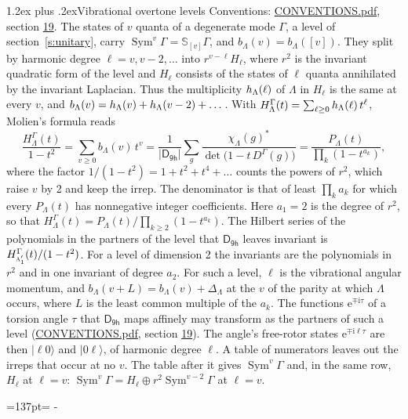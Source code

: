\documentclass[10pt,a4paper]{article}
\makeatletter
\renewcommand\section{\@startsection{section}{1}{\z@}{-3ex plus -1ex minus -.2ex}%
  {1.2ex plus .2ex}{\normalfont\large\sffamily\bfseries\color{parttitle}}}
\newcommand{\needspace}[1]{\par\penalty-100\begingroup\dimen0=#1\relax\dimen2=\pagegoal
  \advance\dimen2-\pagetotal\ifdim\dimen0>\dimen2\relax\ifdim\dimen2>0pt\vfil\break\fi\fi
  \endgroup}
\numberwithin{equation}{section}
\newcommand{\grp}[1]{\mathsf{#1}}
\newcommand{\irr}[1]{\text{\normalfont\scshape #1}}
\newcommand{\iunit}{\mathrm{i}}
\newcommand{\expe}{\mathrm{e}}
\newcommand{\repD}[1]{D^{#1}}
\newcommand{\irchar}[1]{\chi_{#1}}
\newcommand{\conj}[1]{{#1}^{*}}
\newcommand{\schur}[1]{\mathbb{S}_{#1}}
\newcommand{\shape}[1]{[#1]}
\newcommand{\occ}[1]{\lvert #1\rangle}
\makeatother
\begin{document}
\section{Vibrational overtone levels}\label{s:overtones}
Conventions: \href{../../CONVENTIONS.pdf}{CONVENTIONS.pdf}, section \href{../../CONVENTIONS.pdf\#conv.19}{19}.
\leavevmode\label{n:index.quanta}\label{n:operator.symmetric.power}The states of $v$ quanta of a degenerate mode $\Gamma$, a level of section~\ref{s:unitary}, carry $\operatorname{Sym}^{v}\Gamma = \schur{\shape{v}}\Gamma$, and $b_\Lambda(v) = b_\Lambda(\shape{v})$. \label{n:local.quadratic.form}\label{n:set.harmonic}They split by harmonic degree $\ell = v, v - 2, \dots$ into $r^{v-\ell}H_\ell$, where $r^2$ is the invariant quadratic form of the level and $H_\ell$ consists of the states of $\ell$ quanta annihilated by the invariant Laplacian. \label{n:function.multiplicity.harmonic}Thus the multiplicity $\mathnormal{h}_\Lambda(\ell)$ of $\Lambda$ in $H_\ell$ is the same at every $v$, and $b_\Lambda(v) = \mathnormal{h}_\Lambda(v) + \mathnormal{h}_\Lambda(v - 2) + \dots$. \label{n:function.generating.level}With $H^{\Gamma}_\Lambda(t) = \sum_{\ell\ge0} \mathnormal{h}_\Lambda(\ell)\,t^{\ell}$, Molien's formula reads
\begin{equation}\label{e:molien}\frac{H^{\Gamma}_\Lambda(t)}{1 - t^2} = \sum_{v\ge0} b_\Lambda(v)\,t^v = \frac{1}{|\grp{D_{9h}}|}\sum_{g}\frac{\conj{\irchar{\Lambda}(g)}}{\det\bigl(1 - t\,\repD{\Gamma}(g)\bigr)} = \frac{P_\Lambda(t)}{\prod_k (1-t^{a_k})},\end{equation}
where the factor $1/(1 - t^2) = 1 + t^2 + t^4 + \dots$ counts the powers of $r^2$, which raise $v$ by 2 and keep the irrep. The denominator is that of least $\prod_k a_k$ for which every $P_\Lambda(t)$ has nonnegative integer coefficients. Here $a_1 = 2$ is the degree of $r^2$, so that $H^{\Gamma}_\Lambda(t) = P_\Lambda(t)/\prod_{k\ge2}(1 - t^{a_k})$. The Hilbert series of the polynomials in the partners of the level that $\grp{D_{9h}}$ leaves invariant is $H^{\Gamma}_{\irr{a}_{1}'}(t)/(1 - t^2)$. For a level of dimension 2 the invariants are the polynomials in $r^2$ and in one invariant of degree $a_2$. \label{n:index.overtone.period}\label{n:index.increment.unitary}For such a level, $\ell$ is the vibrational angular momentum, and $b_\Lambda(v + L) = b_\Lambda(v) + \Delta_\Lambda$ at the $v$ of the parity at which $\Lambda$ occurs, where $L$ is the least common multiple of the $a_k$. \label{n:local.torsion.angle}The functions $\expe^{\mp\iunit\tau}$ of a torsion angle $\tau$ that $\grp{D_{9h}}$ maps affinely may transform as the partners of such a level (\href{../../CONVENTIONS.pdf}{CONVENTIONS.pdf}, section \href{../../CONVENTIONS.pdf\#conv.19}{19}). The angle's free-rotor states $\expe^{\mp\iunit\ell\tau}$ are then $\occ{\ell 0}$ and $\occ{0 \ell}$, of harmonic degree $\ell$. A table of numerators leaves out the irreps that occur at no $v$. The table after it gives $\operatorname{Sym}^{v}\Gamma$ and, in the same row, $H_\ell$ at $\ell = v$: $\operatorname{Sym}^{v}\Gamma = H_\ell \oplus r^2\operatorname{Sym}^{v-2}\Gamma$ at $\ell = v$.
\needspace{137pt}
\end{document}
